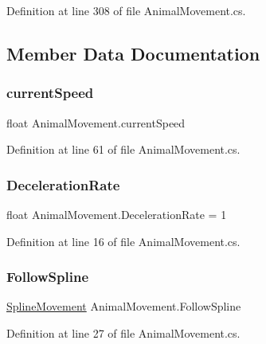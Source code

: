 Definition at line 308 of file Animal\+Movement.\+cs.



\subsection{Member Data Documentation}
\mbox{\label{class_animal_movement_ada208ed3d52f913996f3d4df70e84bbe}} 
\subsubsection{\texorpdfstring{current\+Speed}{currentSpeed}}
{\footnotesize\ttfamily float Animal\+Movement.\+current\+Speed}



Definition at line 61 of file Animal\+Movement.\+cs.

\mbox{\label{class_animal_movement_ae514c884c8eb98e4b21eed0219e2fea5}} 
\subsubsection{\texorpdfstring{Deceleration\+Rate}{DecelerationRate}}
{\footnotesize\ttfamily float Animal\+Movement.\+Deceleration\+Rate = 1}



Definition at line 16 of file Animal\+Movement.\+cs.

\mbox{\label{class_animal_movement_a03fe5bb09df01348e477660e63ee0b28}} 
\subsubsection{\texorpdfstring{Follow\+Spline}{FollowSpline}}
{\footnotesize\ttfamily \mbox{\hyperlink{class_spline_movement}{Spline\+Movement}} Animal\+Movement.\+Follow\+Spline}



Definition at line 27 of file Animal\+Movement.\+cs.

